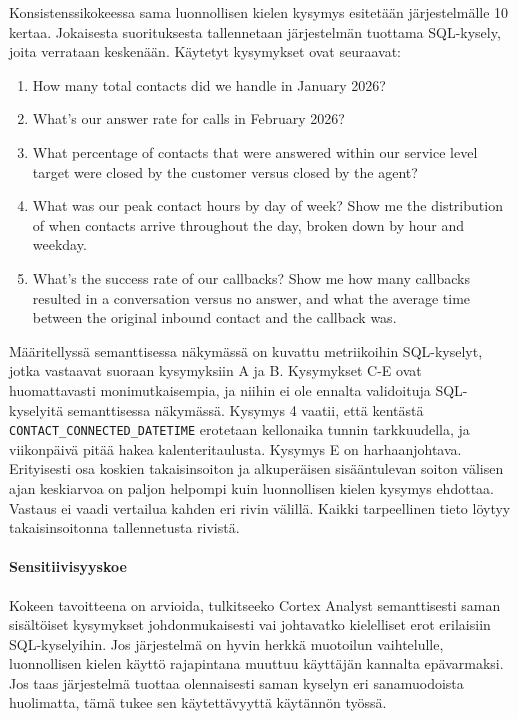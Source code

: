 Konsistenssikokeessa sama luonnollisen kielen kysymys esitetään järjestelmälle 10 kertaa. Jokaisesta suorituksesta tallennetaan järjestelmän tuottama SQL-kysely, joita verrataan keskenään. Käytetyt kysymykset ovat seuraavat:
\begin{enumerate}[label=\Alph*.]
    \label{it:q_consistency}
  \item How many total contacts did we handle in January 2026?
  \item What's our answer rate for calls in February 2026?
  \item What percentage of contacts that were answered within our service level target were closed by the customer versus closed by the agent?
  \item What was our peak contact hours by day of week? Show me the distribution of when contacts arrive throughout the day, broken down by hour and weekday.
  \item What's the success rate of our callbacks? Show me how many callbacks resulted in a conversation versus no answer, and what the average time between the original inbound contact and the callback was.
\end{enumerate}

Määritellyssä semanttisessa näkymässä on kuvattu metriikoihin SQL-kyselyt, jotka vastaavat suoraan kysymyksiin A ja B. Kysymykset C-E ovat huomattavasti monimutkaisempia, ja niihin ei ole ennalta validoituja SQL-kyselyitä semanttisessa näkymässä. Kysymys 4 vaatii, että kentästä \texttt{CONTACT\_CONNECTED\_DATETIME} erotetaan kellonaika tunnin tarkkuudella, ja viikonpäivä pitää hakea kalenteritaulusta. Kysymys E on harhaanjohtava. Erityisesti osa koskien takaisinsoiton ja alkuperäisen sisääntulevan soiton välisen ajan keskiarvoa on paljon helpompi kuin luonnollisen kielen kysymys ehdottaa. Vastaus ei vaadi vertailua kahden eri rivin välillä. Kaikki tarpeellinen tieto löytyy takaisinsoitonna tallennetusta rivistä.

\paragraph{Sensitiivisyyskoe}
Kokeen tavoitteena on arvioida, tulkitseeko Cortex Analyst semanttisesti saman sisältöiset kysymykset johdonmukaisesti vai johtavatko kielelliset erot erilaisiin SQL-kyselyihin. Jos järjestelmä on hyvin herkkä muotoilun vaihtelulle, luonnollisen kielen käyttö rajapintana muuttuu käyttäjän kannalta epävarmaksi. Jos taas järjestelmä tuottaa olennaisesti saman kyselyn eri sanamuodoista huolimatta, tämä tukee sen käytettävyyttä käytännön työssä.


